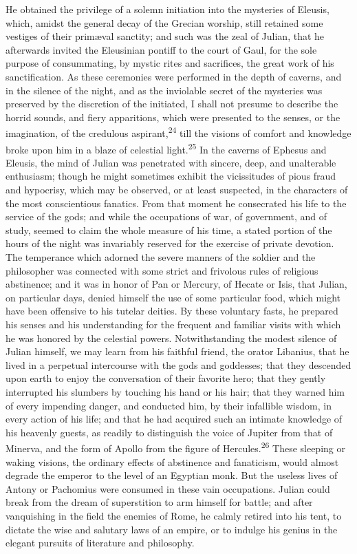 He obtained the privilege of a solemn initiation into the
mysteries of Eleusis, which, amidst the general decay of the
Grecian worship, still retained some vestiges of their primæval
sanctity; and such was the zeal of Julian, that he afterwards
invited the Eleusinian pontiff to the court of Gaul, for the sole
purpose of consummating, by mystic rites and sacrifices, the
great work of his sanctification. As these ceremonies were
performed in the depth of caverns, and in the silence of the
night, and as the inviolable secret of the mysteries was
preserved by the discretion of the initiated, I shall not presume
to describe the horrid sounds, and fiery apparitions, which were
presented to the senses, or the imagination, of the credulous
aspirant,\textsuperscript{24} till the visions of comfort and knowledge broke upon
him in a blaze of celestial light.\textsuperscript{25} In the caverns of Ephesus
and Eleusis, the mind of Julian was penetrated with sincere,
deep, and unalterable enthusiasm; though he might sometimes
exhibit the vicissitudes of pious fraud and hypocrisy, which may
be observed, or at least suspected, in the characters of the most
conscientious fanatics. From that moment he consecrated his life
to the service of the gods; and while the occupations of war, of
government, and of study, seemed to claim the whole measure of
his time, a stated portion of the hours of the night was
invariably reserved for the exercise of private devotion. The
temperance which adorned the severe manners of the soldier and
the philosopher was connected with some strict and frivolous
rules of religious abstinence; and it was in honor of Pan or
Mercury, of Hecate or Isis, that Julian, on particular days,
denied himself the use of some particular food, which might have
been offensive to his tutelar deities. By these voluntary fasts,
he prepared his senses and his understanding for the frequent and
familiar visits with which he was honored by the celestial
powers. Notwithstanding the modest silence of Julian himself, we
may learn from his faithful friend, the orator Libanius, that he
lived in a perpetual intercourse with the gods and goddesses;
that they descended upon earth to enjoy the conversation of their
favorite hero; that they gently interrupted his slumbers by
touching his hand or his hair; that they warned him of every
impending danger, and conducted him, by their infallible wisdom,
in every action of his life; and that he had acquired such an
intimate knowledge of his heavenly guests, as readily to
distinguish the voice of Jupiter from that of Minerva, and the
form of Apollo from the figure of Hercules.\textsuperscript{26} These sleeping or
waking visions, the ordinary effects of abstinence and
fanaticism, would almost degrade the emperor to the level of an
Egyptian monk. But the useless lives of Antony or Pachomius were
consumed in these vain occupations. Julian could break from the
dream of superstition to arm himself for battle; and after
vanquishing in the field the enemies of Rome, he calmly retired
into his tent, to dictate the wise and salutary laws of an
empire, or to indulge his genius in the elegant pursuits of
literature and philosophy.

